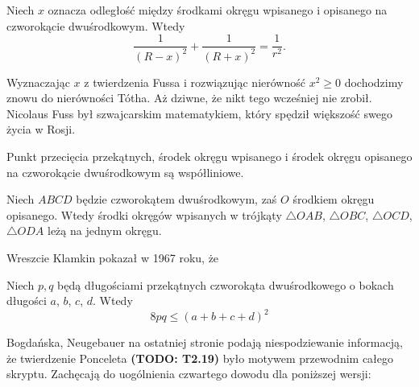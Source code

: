 \begin{theorem}[Fussa, 1792]
	Niech $x$ oznacza odległość między środkami okręgu wpisanego i opisanego na czworokącie dwuśrodkowym.
	Wtedy
	\begin{equation}
		\frac{1}{(R-x)^2} + \frac{1}{(R+x)^2} = \frac{1}{r^2}.
	\end{equation}
\end{theorem}

Wyznaczając $x$ z twierdzenia Fussa i rozwiązując nierówność $x^2 \ge 0$ dochodzimy znowu do nierówności Tótha.
Aż dziwne, że nikt tego wcześniej nie zrobił.
Nicolaus Fuss był szwajcarskim matematykiem, który spędził większość swego życia w Rosji.

\begin{proposition}
	Punkt przecięcia przekątnych, środek okręgu wpisanego i środek okręgu opisanego na czworokącie dwuśrodkowym są współliniowe.
\end{proposition}

\begin{proposition}
	Niech $ABCD$ będzie czworokątem dwuśrodkowym, zaś $O$ środkiem okręgu opisanego.
	Wtedy środki okręgów wpisanych w trójkąty $\triangle OAB$, $\triangle OBC$, $\triangle OCD$, $\triangle ODA$ leżą na jednym okręgu.
\end{proposition}

Wreszcie Klamkin pokazał w 1967 roku, że
\begin{proposition}
    Niech $p, q$ będą długościami przekątnych czworokąta dwuśrodkowego o bokach długości $a$, $b$, $c$, $d$.
    Wtedy
    \begin{equation}
        8 pq \le (a + b + c + d)^2
    \end{equation}
\end{proposition}





Bogdańska, Neugebauer \cite[s. 267]{neugebauer_2018} na ostatniej stronie podają niespodziewanie informacją, że twierdzenie Ponceleta {\color{red}\textbf{(TODO: T2.19)}\color{black}} było motywem przewodnim całego skryptu.
Zachęcają do uogólnienia czwartego dowodu dla poniższej wersji:

